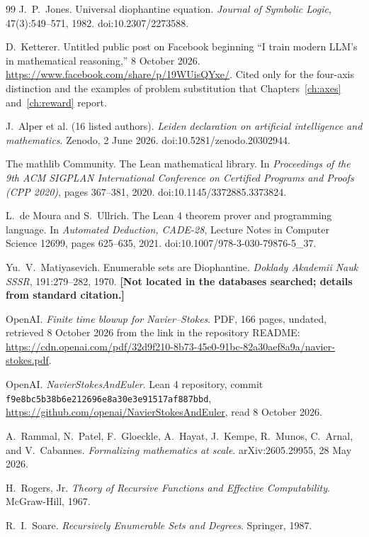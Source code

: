 \begin{thebibliography}{99}
 J.~P.~Jones. Universal diophantine equation. \emph{Journal of Symbolic Logic}, 47(3):549--571, 1982. doi:10.2307/2273588.

 D.~Ketterer. Untitled public post on Facebook beginning ``I train modern LLM's in mathematical reasoning,'' 8 October 2026. \url{https://www.facebook.com/share/p/19WUisQYxe/}. Cited only for the four-axis distinction and the examples of problem substitution that Chapters~\ref{ch:axes} and~\ref{ch:reward} report.

 J.~Alper et al. (16 listed authors). \emph{Leiden declaration on artificial intelligence and mathematics}. Zenodo, 2 June 2026. doi:10.5281/zenodo.20302944.

 The mathlib Community. The Lean mathematical library. In \emph{Proceedings of the 9th ACM SIGPLAN International Conference on Certified Programs and Proofs (CPP 2020)}, pages 367--381, 2020. doi:10.1145/3372885.3373824.

 L.~de Moura and S.~Ullrich. The Lean 4 theorem prover and programming language. In \emph{Automated Deduction, CADE-28}, Lecture Notes in Computer Science 12699, pages 625--635, 2021. doi:10.1007/978-3-030-79876-5\_37.

 Yu.~V.~Matiyasevich. Enumerable sets are Diophantine. \emph{Doklady Akademii Nauk SSSR}, 191:279--282, 1970. \textbf{[Not located in the databases searched; details from standard citation.]}

 OpenAI. \emph{Finite time blowup for Navier--Stokes}. PDF, 166 pages, undated, retrieved 8 October 2026 from the link in the repository README: \url{https://cdn.openai.com/pdf/32d9f210-8b73-45e0-91bc-82a30aef8a9a/navier-stokes.pdf}.

 OpenAI. \emph{NavierStokesAndEuler}. Lean 4 repository, commit \texttt{f9e8bc5b38b6e212696e8a30e3e91517af887bbd}, \url{https://github.com/openai/NavierStokesAndEuler}, read 8 October 2026.

 A.~Rammal, N.~Patel, F.~Gloeckle, A.~Hayat, J.~Kempe, R.~Munos, C.~Arnal, and V.~Cabannes. \emph{Formalizing mathematics at scale}. arXiv:2605.29955, 28 May 2026.

 H.~Rogers, Jr. \emph{Theory of Recursive Functions and Effective Computability}. McGraw-Hill, 1967.

 R.~I.~Soare. \emph{Recursively Enumerable Sets and Degrees}. Springer, 1987.


\end{thebibliography}
